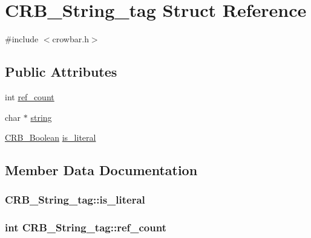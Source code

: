 \hypertarget{struct_c_r_b___string__tag}{}\section{C\+R\+B\+\_\+\+String\+\_\+tag Struct Reference}
\label{struct_c_r_b___string__tag}


{\ttfamily \#include $<$crowbar.\+h$>$}

\subsection*{Public Attributes}
\begin{DoxyCompactItemize}
\item 
int \hyperlink{struct_c_r_b___string__tag_ace00533a7fe483a5f939f0fd59903dd7}{ref\+\_\+count}
\item 
char $\ast$ \hyperlink{struct_c_r_b___string__tag_a797e7b2d75e0c612d1a1a956d2ffd5ad}{string}
\item 
\hyperlink{_c_r_b__dev_8h_a5000f2b447c9132c07d7f1cf66134a69}{C\+R\+B\+\_\+\+Boolean} \hyperlink{struct_c_r_b___string__tag_a82d515771ee47a64edd80c656f9eadc5}{is\+\_\+literal}
\end{DoxyCompactItemize}


\subsection{Member Data Documentation}
\hypertarget{struct_c_r_b___string__tag_a82d515771ee47a64edd80c656f9eadc5}{}
\subsubsection[{is\+\_\+literal}]{ C\+R\+B\+\_\+\+String\+\_\+tag\+::is\+\_\+literal}\label{struct_c_r_b___string__tag_a82d515771ee47a64edd80c656f9eadc5}
\hypertarget{struct_c_r_b___string__tag_ace00533a7fe483a5f939f0fd59903dd7}{}
\subsubsection[{ref\+\_\+count}]{\setlength{\rightskip}{0pt plus 5cm}int C\+R\+B\+\_\+\+String\+\_\+tag\+::ref\+\_\+count}\label{struct_c_r_b___string__tag_ace00533a7fe483a5f939f0fd59903dd7}
\hypertarget{struct_c_r_b___string__tag_a797e7b2d75e0c612d1a1a956d2ffd5ad}{}
